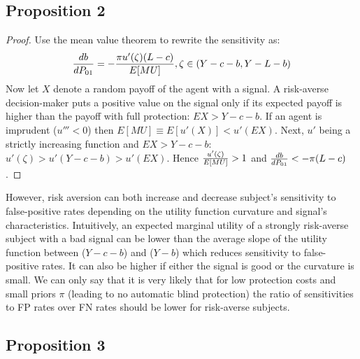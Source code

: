 \documentclass[12pt,a4paper]{article}
\begin{document}
\subsection{Proposition 2}
\begin{proof}
Use the mean value theorem to rewrite the sensitivity as:
$${db\over dP_{01}}=-{\pi u'(\zeta)(L-c)\over E[MU]},\zeta \in \left(Y-c-b, Y-L-b\right)$$
Now let $X$ denote a random payoff of the agent with a signal. A risk-averse decision-maker puts a positive value on the signal only if its expected payoff is higher than the payoff with full protection: $EX>Y-c-b$. If an agent is imprudent ($u'''<0$) then $E[MU]\equiv E[u'(X)]<u'(EX)$. Next, $u'$ being a strictly increasing function and $EX>Y-c-b$: $u'(\zeta)>u'(Y-c-b)>u'(EX)$. Hence ${u'(\zeta)\over E[MU]}>1$ and ${db\over dP_{01}}<-\pi(L-c)$. 
\end{proof}

However, risk aversion can both increase and decrease subject's sensitivity to false-positive rates depending on the utility function curvature and signal's characteristics. Intuitively, an expected marginal utility of a strongly risk-averse subject with a bad signal can be lower than the average slope of the utility function between ($Y-c-b$) and ($Y-b$) which reduces sensitivity to false-positive rates. It can also be higher if either the signal is good or the curvature is small. We can only say that it is very likely that for low protection costs and small priors $\pi$ (leading to no automatic blind protection) the ratio of sensitivities to FP rates over FN rates should be lower for risk-averse subjects. 


\subsection{Proposition 3}
\end{document}
